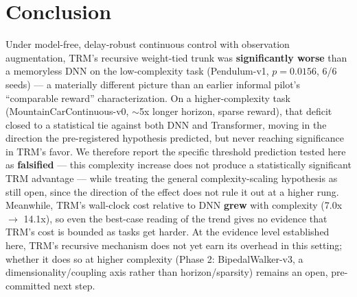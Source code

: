 \documentclass[11pt]{article}
\begin{document}
\section{Conclusion}

Under model-free, delay-robust continuous control with observation augmentation, TRM's recursive weight-tied trunk was \textbf{significantly worse} than a memoryless DNN on the low-complexity task (Pendulum-v1, $p=0.0156$, 6/6 seeds) --- a materially different picture than an earlier informal pilot's ``comparable reward'' characterization. On a higher-complexity task (MountainCarContinuous-v0, $\sim$5x longer horizon, sparse reward), that deficit closed to a statistical tie against both DNN and Transformer, moving in the direction the pre-registered hypothesis predicted, but never reaching significance in TRM's favor. We therefore report the specific threshold prediction tested here as \textbf{falsified} --- this complexity increase does not produce a statistically significant TRM advantage --- while treating the general complexity-scaling hypothesis as still open, since the direction of the effect does not rule it out at a higher rung. Meanwhile, TRM's wall-clock cost relative to DNN \textbf{grew} with complexity (7.0x $\to$ 14.1x), so even the best-case reading of the trend gives no evidence that TRM's cost is bounded as tasks get harder. At the evidence level established here, TRM's recursive mechanism does not yet earn its overhead in this setting; whether it does so at higher complexity (Phase 2: BipedalWalker-v3, a dimensionality/coupling axis rather than horizon/sparsity) remains an open, pre-committed next step.
\end{document}
